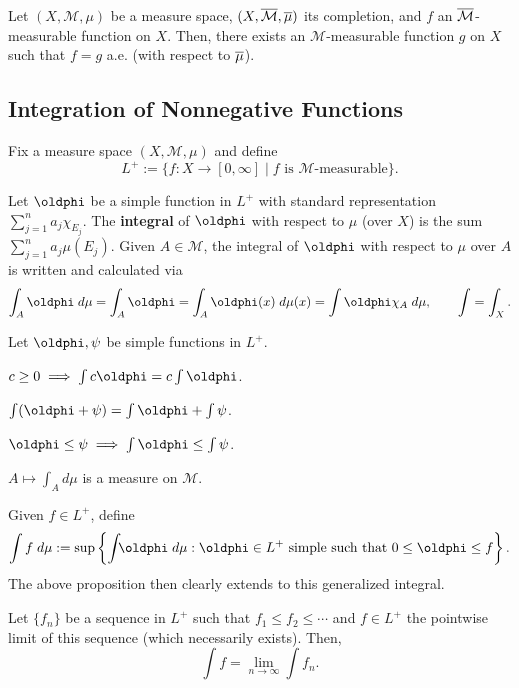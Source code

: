 \documentclass[11pt]{article}
\newcommand{\M}{\mathcal{M}}
\newcommand{\Int}[3]{\int_{#1}{#2}\;d{#3}}
\renewcommand{\phi}{\oldphi}
\newcommand{\llim}{\displaystyle\lim}
\newcommand{\ssum}{\displaystyle\sum}
\begin{document}
\begin{proposition}\label{complete_approximation}
Let $(X,\M,\mu)$ be a measure space, $(X,\ov{\M},\ov{\mu})$ its completion, and $f$ an $\ov{\M}$-measurable function on $X$. Then, there exists an $\M$-measurable function $g$ on $X$ such that $f=g$ a.e. (with respect to $\overline{\mu}$).
\end{proposition}

\subsection{Integration of Nonnegative Functions}
Fix a measure space $(X,\M,\mu)$ and define
$$L^+:=\{f: X\to[0,\infty] \mid f\textrm{ is }\M\textrm{-measurable}\}.$$

\begin{definition}
Let $\phi$ be a simple function in $L^+$ with standard representation $\ssum_{j=1}^na_j\chi_{E_j}$. The \textbf{integral} of $\phi$ with respect to $\mu$ (over $X$) is the sum $\ssum_{j=1}^na_j\mu(E_j)$. Given $A\in\M$, the integral of $\phi$ with respect to $\mu$ over $A$ is written and calculated via
$$\Int{A}{\phi}{\mu}=\int_A\phi=\Int{A}{\phi(x)}{\mu(x)}=\int\phi\chi_A\;d\mu,\qquad\int=\int_X.$$
\end{definition}

\begin{proposition}
Let $\phi,\psi$ be simple functions in $L^+$.
\begin{enum}{\alph}
\item $c\geq0\implies\int c\phi=c\int\phi$.
\item $\int(\phi+\psi)=\int\phi+\int\psi$.
\item $\phi\leq\psi\implies\int\phi\leq\int\psi$.
\item $A\mapsto\int_Ad\mu$ is a measure on $\M$.
\end{enum}
\end{proposition}

Given $f\in L^+$, define 
$$\int f\;d\mu:=\sup\left\{\Int{}{\phi}{\mu} : \phi\in L^+\textrm{ simple such that }0\leq\phi\leq f\right\}.$$
The above proposition then clearly extends to this generalized integral.

\begin{theorem}
Let $\{f_n\}$ be a sequence in $L^+$ such that $f_1\leq f_2\leq\cdots$ and $f\in L^+$ the pointwise limit of this sequence (which necessarily exists). Then, 
$$\int f=\llim_{n\to\infty}\int f_n.$$
\end{theorem}
\end{document}
